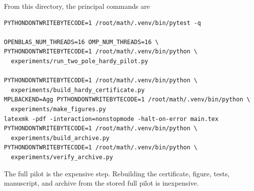 \documentclass[11pt]{article}
\theoremstyle{definition}
\theoremstyle{remark}
\begin{document}
From this directory, the principal commands are
\begin{verbatim}
PYTHONDONTWRITEBYTECODE=1 /root/math/.venv/bin/pytest -q

OPENBLAS_NUM_THREADS=16 OMP_NUM_THREADS=16 \
PYTHONDONTWRITEBYTECODE=1 /root/math/.venv/bin/python \
  experiments/run_two_pole_hardy_pilot.py

PYTHONDONTWRITEBYTECODE=1 /root/math/.venv/bin/python \
  experiments/build_hardy_certificate.py
MPLBACKEND=Agg PYTHONDONTWRITEBYTECODE=1 /root/math/.venv/bin/python \
  experiments/make_figures.py
latexmk -pdf -interaction=nonstopmode -halt-on-error main.tex
PYTHONDONTWRITEBYTECODE=1 /root/math/.venv/bin/python \
  experiments/build_archive.py
PYTHONDONTWRITEBYTECODE=1 /root/math/.venv/bin/python \
  experiments/verify_archive.py
\end{verbatim}

The full pilot is the expensive step.  Rebuilding the certificate, figure,
tests, manuscript, and archive from the stored full pilot is inexpensive.



\end{document}
